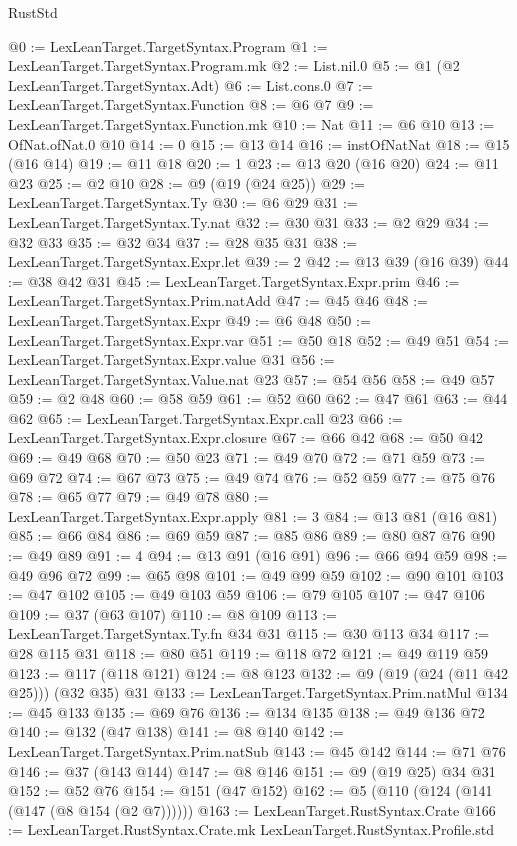 \begin{lexlean}{RustStd}
\begin{coremodule}
{\begin{coremodule}
{{{{{{{{{@0 := LexLeanTarget.TargetSyntax.Program
@1 := LexLeanTarget.TargetSyntax.Program.mk
@2 := List.nil.{0}
@5 := @1 (@2 LexLeanTarget.TargetSyntax.Adt)
@6 := List.cons.{0}
@7 := LexLeanTarget.TargetSyntax.Function
@8 := @6 @7
@9 := LexLeanTarget.TargetSyntax.Function.mk
@10 := Nat
@11 := @6 @10
@13 := OfNat.ofNat.{0} @10
@14 := 0
@15 := @13 @14
@16 := instOfNatNat
@18 := @15 (@16 @14)
@19 := @11 @18
@20 := 1
@23 := @13 @20 (@16 @20)
@24 := @11 @23
@25 := @2 @10
@28 := @9 (@19 (@24 @25))
@29 := LexLeanTarget.TargetSyntax.Ty
@30 := @6 @29
@31 := LexLeanTarget.TargetSyntax.Ty.nat
@32 := @30 @31
@33 := @2 @29
@34 := @32 @33
@35 := @32 @34
@37 := @28 @35 @31
@38 := LexLeanTarget.TargetSyntax.Expr.let
@39 := 2
@42 := @13 @39 (@16 @39)
@44 := @38 @42 @31
@45 := LexLeanTarget.TargetSyntax.Expr.prim
@46 := LexLeanTarget.TargetSyntax.Prim.natAdd
@47 := @45 @46
@48 := LexLeanTarget.TargetSyntax.Expr
@49 := @6 @48
@50 := LexLeanTarget.TargetSyntax.Expr.var
@51 := @50 @18
@52 := @49 @51
@54 := LexLeanTarget.TargetSyntax.Expr.value @31
@56 := LexLeanTarget.TargetSyntax.Value.nat @23
@57 := @54 @56
@58 := @49 @57
@59 := @2 @48
@60 := @58 @59
@61 := @52 @60
@62 := @47 @61
@63 := @44 @62
@65 := LexLeanTarget.TargetSyntax.Expr.call @23
@66 := LexLeanTarget.TargetSyntax.Expr.closure
@67 := @66 @42
@68 := @50 @42
@69 := @49 @68
@70 := @50 @23
@71 := @49 @70
@72 := @71 @59
@73 := @69 @72
@74 := @67 @73
@75 := @49 @74
@76 := @52 @59
@77 := @75 @76
@78 := @65 @77
@79 := @49 @78
@80 := LexLeanTarget.TargetSyntax.Expr.apply
@81 := 3
@84 := @13 @81 (@16 @81)
@85 := @66 @84
@86 := @69 @59
@87 := @85 @86
@89 := @80 @87 @76
@90 := @49 @89
@91 := 4
@94 := @13 @91 (@16 @91)
@96 := @66 @94 @59
@98 := @49 @96 @72
@99 := @65 @98
@101 := @49 @99 @59
@102 := @90 @101
@103 := @47 @102
@105 := @49 @103 @59
@106 := @79 @105
@107 := @47 @106
@109 := @37 (@63 @107)
@110 := @8 @109
@113 := LexLeanTarget.TargetSyntax.Ty.fn @34 @31
@115 := @30 @113 @34
@117 := @28 @115 @31
@118 := @80 @51
@119 := @118 @72
@121 := @49 @119 @59
@123 := @117 (@118 @121)
@124 := @8 @123
@132 := @9 (@19 (@24 (@11 @42 @25))) (@32 @35) @31
@133 := LexLeanTarget.TargetSyntax.Prim.natMul
@134 := @45 @133
@135 := @69 @76
@136 := @134 @135
@138 := @49 @136 @72
@140 := @132 (@47 @138)
@141 := @8 @140
@142 := LexLeanTarget.TargetSyntax.Prim.natSub
@143 := @45 @142
@144 := @71 @76
@146 := @37 (@143 @144)
@147 := @8 @146
@151 := @9 (@19 @25) @34 @31
@152 := @52 @76
@154 := @151 (@47 @152)
@162 := @5 (@110 (@124 (@141 (@147 (@8 @154 (@2 @7))))))
@163 := LexLeanTarget.RustSyntax.Crate
@166 := LexLeanTarget.RustSyntax.Crate.mk LexLeanTarget.RustSyntax.Profile.std
}}}}}}}}}
\end{coremodule}}
\end{coremodule}
\end{lexlean}
